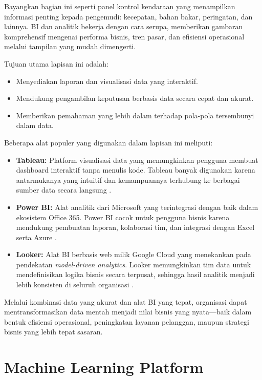 Bayangkan bagian ini seperti panel kontrol kendaraan yang menampilkan informasi penting kepada pengemudi: kecepatan, bahan bakar, peringatan, dan lainnya. BI dan analitik bekerja dengan cara serupa, memberikan gambaran komprehensif mengenai performa bisnis, tren pasar, dan efisiensi operasional melalui tampilan yang mudah dimengerti.

Tujuan utama lapisan ini adalah:
\begin{itemize}
	\item Menyediakan laporan dan visualisasi data yang interaktif.
	\item Mendukung pengambilan keputusan berbasis data secara cepat dan akurat.
	\item Memberikan pemahaman yang lebih dalam terhadap pola-pola tersembunyi dalam data.
\end{itemize}

Beberapa alat populer yang digunakan dalam lapisan ini meliputi:

\begin{itemize}
	\item \textbf{Tableau:} Platform visualisasi data yang memungkinkan pengguna membuat dashboard interaktif tanpa menulis kode. Tableau banyak digunakan karena antarmukanya yang intuitif dan kemampuannya terhubung ke berbagai sumber data secara langsung \cite{tableau2023}.
	
	\item \textbf{Power BI:} Alat analitik dari Microsoft yang terintegrasi dengan baik dalam ekosistem Office 365. Power BI cocok untuk pengguna bisnis karena mendukung pembuatan laporan, kolaborasi tim, dan integrasi dengan Excel serta Azure \cite{microsoftpowerbi2023}.
	
	\item \textbf{Looker:} Alat BI berbasis web milik Google Cloud yang menekankan pada pendekatan \textit{model-driven analytics}. Looker memungkinkan tim data untuk mendefinisikan logika bisnis secara terpusat, sehingga hasil analitik menjadi lebih konsisten di seluruh organisasi \cite{lookerdocs}.
\end{itemize}

Melalui kombinasi data yang akurat dan alat BI yang tepat, organisasi dapat mentransformasikan data mentah menjadi nilai bisnis yang nyata—baik dalam bentuk efisiensi operasional, peningkatan layanan pelanggan, maupun strategi bisnis yang lebih tepat sasaran.

\section{Machine Learning Platform}


